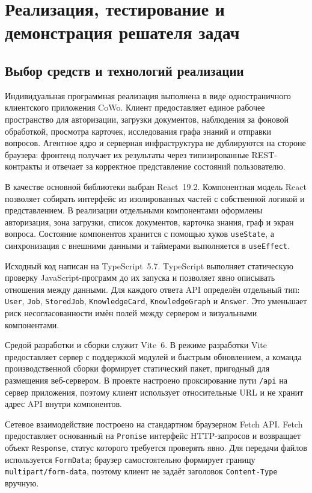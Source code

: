 \section{Реализация, тестирование и демонстрация решателя задач}

\subsection{Выбор средств и технологий реализации}

Индивидуальная программная реализация выполнена в виде одностраничного клиентского приложения CoWo. Клиент предоставляет единое рабочее пространство для авторизации, загрузки документов, наблюдения за фоновой обработкой, просмотра карточек, исследования графа знаний и отправки вопросов. Агентное ядро и серверная инфраструктура не дублируются на стороне браузера: фронтенд получает их результаты через типизированные REST-контракты и отвечает за корректное представление состояний пользователю.

В качестве основной библиотеки выбран React~19.2. Компонентная модель React позволяет собирать интерфейс из изолированных частей с собственной логикой и представлением. \cite{ReactDocs2026} В реализации отдельными компонентами оформлены авторизация, зона загрузки, список документов, карточка знания, граф и экран вопроса. Состояние компонентов хранится с помощью хуков \texttt{useState}, а синхронизация с внешними данными и таймерами выполняется в \texttt{useEffect}.

Исходный код написан на TypeScript~5.7. TypeScript выполняет статическую проверку JavaScript-программ до их запуска и позволяет явно описывать отношения между данными. \cite{TypeScriptDocs2026} Для каждого ответа API определён отдельный тип: \texttt{User}, \texttt{Job}, \texttt{StoredJob}, \texttt{KnowledgeCard}, \texttt{KnowledgeGraph} и \texttt{Answer}. Это уменьшает риск несогласованности имён полей между сервером и визуальными компонентами.

Средой разработки и сборки служит Vite~6. В режиме разработки Vite предоставляет сервер с поддержкой модулей и быстрым обновлением, а команда производственной сборки формирует статический пакет, пригодный для размещения веб-сервером. \cite{ViteDocs2026} В проекте настроено проксирование пути \texttt{/api} на сервер приложения, поэтому клиент использует относительные URL и не хранит адрес API внутри компонентов.

Сетевое взаимодействие построено на стандартном браузерном Fetch API. Fetch предоставляет основанный на \texttt{Promise} интерфейс HTTP-запросов и возвращает объект \texttt{Response}, статус которого требуется проверять явно. \cite{FetchMDN2026} Для передачи файлов используется \texttt{FormData}; браузер самостоятельно формирует границу \texttt{multipart/form-data}, поэтому клиент не задаёт заголовок \texttt{Content-Type} вручную. \cite{FormDataMDN2026}

